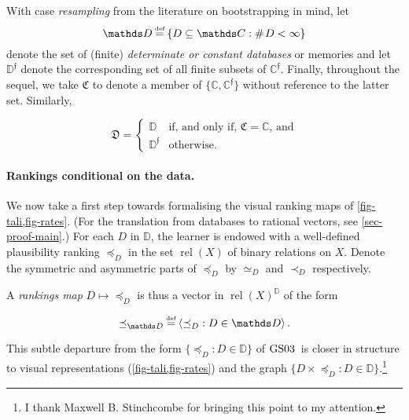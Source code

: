 \documentclass[12pt,a4paper,twoside]{article}
\newcommand{\gsii}{$\textup{GS03}$}
\newcommand{\relations}{\operatorname{rel}}
\newcommand{\novel}{\mathfrak f}
\newcommand{\precb}{\mathbin{\prec}}
\newcommand{\preceqb}{\mathbin{\preceq}}
\newcommand{\countof}{\mathbin{\#}\hskip1pt}
\newcommand{\mbbd}{{\mathds D}}
\newcommand{\mbbdp}{{\mathds D^{\novel}}}
\newcommand{\dpp}{{\mathfrak D}}
\newcommand{\mbbc}{{\mathds C}}
\newcommand{\mbbcp}{{\mathds C^{\novel}}}
\newcommand{\cpp}{{\mathfrak C}}
\newcommand{\lbc}{\left\{}
\newcommand{\rbc}{\right\}}
\begin{document}
With case \emph{resampling} from the literature on bootstrapping in mind, let
\begin{equation*}\mbbd\defeq \lbc D\subseteq \mbbc: \countof D < \infty \rbc \end{equation*} denote the set
of (finite) \emph{determinate or constant databases} or memories and let
$\mbbdp$ denote the corresponding set of all finite subsets of $\mbbcp$.
Finally, throughout the sequel, we take $\cpp$ to denote a member of
$\{\mbbc, \mbbcp\}$ without reference to the latter set. Similarly, 
\begin{linenomath*} \begin{equation*} \text{$\dpp$} =
  \left\{ \begin{array}{ll} \mbbd & \text{if, and only if, $\cpp = \mbbc$,
  and}\\ \mbbdp & \text{otherwise.} \end{array}\right.  \end{equation*}
\end{linenomath*}
\paragraph{Rankings conditional on the data.}\hskip-5pt We now take a first
step towards formalising the visual ranking maps of \cref{fig-tali,fig-rates}.
(For the translation from databases to rational vectors, see
\cref{sec-proof-main}.)
For each $D$ in $\mbbd$, the learner is endowed with a well-defined
plausibility ranking $\preceqb_D$ in the set $\relations(X)$ of binary
relations on $X$.  Denote the symmetric and asymmetric parts of $\preceqb_D$ by
$\simeq _D$ and $\precb_D$ respectively. 

A \emph{rankings map} $D \mapsto \preceqb_{D}$ is thus a vector in
$\relations(X)^{\mbbd}$ of the form
\begin{linenomath*}
  \begin{equation*}\preceqb_{\mbbd} \defeq \langle\preceqb_{D} : D\in
  \mbbd\rangle\,.\end{equation*}
\end{linenomath*}
This subtle departure from the form $\{\preceqb_{D} : D \in \mbbd\}$ of \gsii\
is closer in structure to visual representations (\cref{fig-tali,fig-rates})
and the graph $\{D \times \preceqb_{D} : D \in \mbbd\}$.\footnote{I thank
Maxwell B.  Stinchcombe for bringing this point to my attention.}
\end{document}
